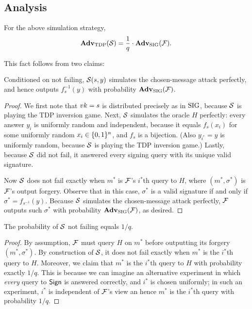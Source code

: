 \documentclass[11pt]{article}
\begin{document}
\subsection{Analysis}

\begin{lemma}
  \label{lem:adv-Sim}
  For the above simulation strategy,
  \[ \mathbf{Adv}_{\text{TDP}}(\mathcal{S}) = \frac{1}{q} \cdot \mathbf{Adv}_{\text{SIG}}(\mathcal{F}). \]
\end{lemma}

\noindent This fact follows from two claims:

\begin{claim}
  Conditioned on not failing, $\mathcal{S}(s,y)$ simulates the chosen-message
  attack perfectly, and hence outputs $f_{s}^{-1}(y)$ with probability
  $\mathbf{Adv}_{\text{SIG}}(\mathcal{F})$.
\end{claim}

\begin{proof}
  We first note that $vk=s$ is distributed precisely as in $\text{SIG}$,
  because $\mathcal{S}$ is playing the TDP inversion game.  Next, $\mathcal{S}$
  simulates the oracle $H$ perfectly: every answer $y_{i}$ is
  uniformly random and independent, because it equals $f_{s}(x_{i})$
  for some uniformly random $x_{i} \in \{0,1\}^{n}$, and $f_{s}$ is a
  bijection.  (Also $y_{i^{*}} = y$ is uniformly random, because
  $\mathcal{S}$ is playing the TDP inversion game.)  Lastly, because $\mathcal{S}$
  did not fail, it answered every signing query with its unique valid
  signature.

  Now $\mathcal{S}$ does not fail exactly when $m^{*}$ is $\mathcal{F}$'s $i^{*}$th
  query to $H$, where $(m^{*}, \sigma^{*})$ is $\mathcal{F}$'s output
  forgery.  Observe that in this case, $\sigma^*$ is a valid signature
  if and only if $\sigma^*=f_{s^{-1}}(y)$.  Because $\mathcal{S}$ simulates
  the chosen-message attack perfectly, $\mathcal{F}$ outputs such
  $\sigma^{*}$ with probability $\mathbf{Adv}_{\text{SIG}}(\mathcal{F})$, as desired.
\end{proof}

\begin{claim}
  The probability of $\mathcal{S}$ not failing equals $1/q$.
\end{claim}

\begin{proof}
  By assumption, $\mathcal{F}$ must query $H$ on $m^{*}$ before outputting
  its forgery $(m^{*}, \sigma^{*})$.  By construction of $\mathcal{S}$, it
  does not fail exactly when $m^{*}$ is the $i^*$th query to $H$.
  Moreover, we claim that $m^{*}$ is the $i^{*}$th query to $H$ with
  probability exactly $1/q$.  This is because we can imagine an
  alternative experiment in which \emph{every} query to $\mathsf{Sign}$ is
  answered correctly, and $i^{*}$ is chosen uniformly; in such an
  experiment, $i^{*}$ is independent of $\mathcal{F}$'s view an hence $m^{*}$
  is the $i^{*}$th query with probability $1/q$.
\end{proof}
    
\end{document}
